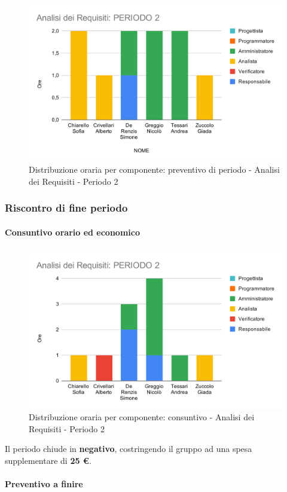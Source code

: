 \begin{figure}[H]
	\centering
	\includegraphics[scale=2]{res/images/charts/preventivo/analisi_2.png}
	\caption{Distribuzione oraria per componente: preventivo di periodo - Analisi dei Requisiti - Periodo 2}
\end{figure}



\subsubsection{Riscontro di fine periodo}


\paragraph{Consuntivo orario ed economico}
\subparagraph*{}

\contabilitaTable{
	
}

\begin{figure}[H]
	\centering
	\includegraphics[scale=2]{res/images/charts/consuntivo/analisi_2.png}
	\caption{Distribuzione oraria per componente: consuntivo - Analisi dei Requisiti - Periodo 2}
\end{figure}

Il periodo chiude in \textbf{negativo}, costringendo il gruppo ad una spesa supplementare di \textbf{25 \euro}. 


\paragraph{Preventivo a finire}
\subparagraph*{}

\pafTable{
	
}